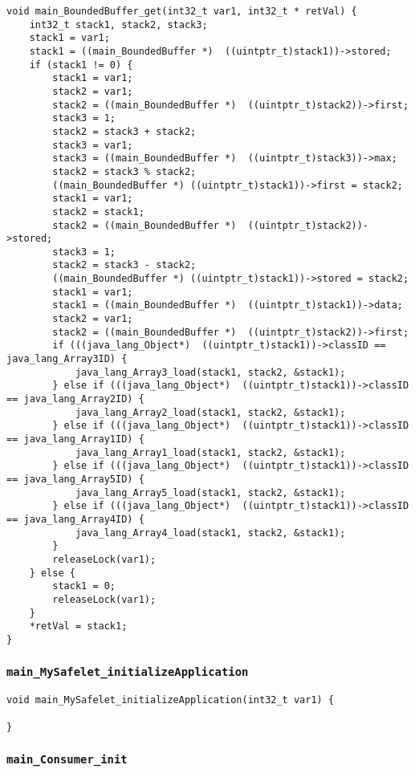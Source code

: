 \begin{landscape}
\begin{multicols}{2}
\begin{lstlisting}[firstnumber=2180]
void main_BoundedBuffer_get(int32_t var1, int32_t * retVal) {
	int32_t stack1, stack2, stack3;
	stack1 = var1;
	stack1 = ((main_BoundedBuffer *)  ((uintptr_t)stack1))->stored;
	if (stack1 != 0) {
		stack1 = var1;
		stack2 = var1;
		stack2 = ((main_BoundedBuffer *)  ((uintptr_t)stack2))->first;
		stack3 = 1;
		stack2 = stack3 + stack2;
		stack3 = var1;
		stack3 = ((main_BoundedBuffer *)  ((uintptr_t)stack3))->max;
		stack2 = stack3 % stack2;
		((main_BoundedBuffer *) ((uintptr_t)stack1))->first = stack2;
		stack1 = var1;
		stack2 = stack1;
		stack2 = ((main_BoundedBuffer *)  ((uintptr_t)stack2))->stored;
		stack3 = 1;
		stack2 = stack3 - stack2;
		((main_BoundedBuffer *) ((uintptr_t)stack1))->stored = stack2;
		stack1 = var1;
		stack1 = ((main_BoundedBuffer *)  ((uintptr_t)stack1))->data;
		stack2 = var1;
		stack2 = ((main_BoundedBuffer *)  ((uintptr_t)stack2))->first;
		if (((java_lang_Object*)  ((uintptr_t)stack1))->classID == java_lang_Array3ID) {
			java_lang_Array3_load(stack1, stack2, &stack1);
		} else if (((java_lang_Object*)  ((uintptr_t)stack1))->classID == java_lang_Array2ID) {
			java_lang_Array2_load(stack1, stack2, &stack1);
		} else if (((java_lang_Object*)  ((uintptr_t)stack1))->classID == java_lang_Array1ID) {
			java_lang_Array1_load(stack1, stack2, &stack1);
		} else if (((java_lang_Object*)  ((uintptr_t)stack1))->classID == java_lang_Array5ID) {
			java_lang_Array5_load(stack1, stack2, &stack1);
		} else if (((java_lang_Object*)  ((uintptr_t)stack1))->classID == java_lang_Array4ID) {
			java_lang_Array4_load(stack1, stack2, &stack1);
		}
		releaseLock(var1);
	} else {
		stack1 = 0;
		releaseLock(var1);
	}
	*retVal = stack1;
}
\end{lstlisting}

\subsubsection{\texttt{main\_MySafelet\_initializeApplication}}

\begin{lstlisting}[firstnumber=2341]
void main_MySafelet_initializeApplication(int32_t var1) {
	
}
\end{lstlisting}

\subsubsection{\texttt{main\_Consumer\_init}}


\end{multicols}
\end{landscape}
